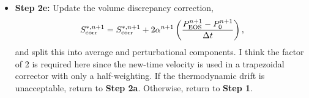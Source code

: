 \documentclass[final]{siamltex}
\def\Fb {{\bf F}}
\def\vb {{\bf v}}
\def\wb {{\bf w}}
\def\Hext {H_{\rm ext}}
\def\half   {\frac{1}{2}}
\begin{document}
\begin{itemize}
\begin{eqnarray}
&&\hspace{-1in} + \half\nabla\cdot\lambda^n\nabla T^n + \half\nabla\cdot\lambda^{n+1,l}\nabla(T^{n+1,l} + \delta T)\nonumber\\
&&\hspace{-1in} + \half\sum_k\nabla\cdot h_k^n \Fb_k^n + \half\sum_k\nabla\cdot h_k^{n+1,l} \Fb_k^{n+1,l}\nonumber\\
&&\hspace{-1in} + \half(\rho\Hext)^n + \half(\rho\Hext)^{n+1},
\end{eqnarray}
\begin{eqnarray}
\left(\frac{\rho^{n+1}c_p^{n+1,l}}{\Delta t} - \nabla\cdot\frac{1}{2}\lambda^{n+1,l}\nabla\right)\delta T &=& \frac{(\rho h)^n - \rho^{n+1}h^{n+1,l}}{\Delta t}\nonumber\\
&&\hspace{-1.25in} + \half\left[-\nabla\cdot(\rho h\vb)^n - \nabla\cdot(\rho h\vb)^{*,n+1} + \frac{\bar{S}^n + \bar{S}_{\rm corr}^n}{\bar{\alpha}^n} + \frac{\bar{S}^{*,n+1} + \bar{S}_{\rm corr}^{*,n+1}}{\bar{\alpha}^{*,n+1}}\right]\nonumber\\
&&\hspace{-1.25in} + \half\nabla\cdot\lambda^n\nabla T^n + \half\nabla\cdot\lambda^{n+1,l}\nabla T^{n+1,l}\nonumber\\
&&\hspace{-1.25in} + \half\sum_k\nabla\cdot h_k^n \Fb_k^n + \half\sum_k\nabla\cdot h_k^{n+1,l} \Fb_k^{n+1,l}\nonumber\\
&&\hspace{-1.25in} + \half(\rho\Hext)^n + \half(\rho\Hext)^{n+1}.
\end{eqnarray}
{\bf Step 2d-3:} Update the temperature and enthalpy using
\begin{equation}
T^{n+1,l+1} = T^{n+1,l} + \delta T, \quad h^{n+1,l+1} = h(\wb^{n+1},T^{n+1,l+1}).
\end{equation}
If $l=l_{\rm max}$, set $(h,T)^{n+1} = (h,T)^{n+1,l+1}$ and proceed to {\bf Step 2e}.\\
\item {\bf Step 2e:} Update the volume discrepancy correction,
\begin{equation}
S_{\rm corr}^{*,n+1} = S_{\rm corr}^{*,n+1} + 2\alpha^{n+1}\left(\frac{P_{\rm EOS}^{n+1} - P_0^{n+1}}{\Delta t}\right),
\end{equation}
and split this into average and perturbational components.
I think the factor of 2 is required here since the new-time
velocity is used in a trapezoidal corrector with only a half-weighting.
If the thermodynamic drift is unacceptable, return to {\bf Step 2a}.
Otherwise, return to {\bf Step 1}.\\
\end{itemize}
\end{document}
